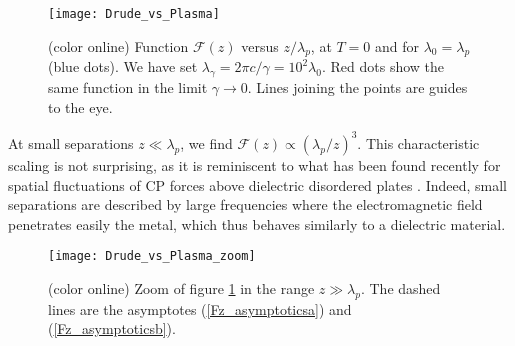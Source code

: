 \documentclass[doublecol]{epl2}
\begin{document}
\begin{figure}[h]
\texttt{[image: Drude\_vs\_Plasma]}
\caption{
\label{Drude_vs_Plasma}
(color online) Function $\mathcal{F}(z)$ versus $z/\lambda_p$, at $T=0$ and for $\lambda_0=\lambda_p$ (blue dots). We have set $\lambda_\gamma=2\pi c/\gamma=10^2\lambda_0$. Red dots show the same function in the limit $\gamma\to 0$. Lines joining the points are guides to the eye.}
\end{figure}
At small separations $z\ll\lambda_p$, we find $\mathcal{F}(z)\propto (\lambda_p/z)^3$. This characteristic scaling is not surprising, as it is reminiscent to what has been found recently for spatial fluctuations of CP forces above dielectric disordered plates \cite{Dean09, Cherroret15}. Indeed, small separations are described by large frequencies where the electromagnetic field penetrates easily the metal, which thus behaves similarly to a dielectric material. 
\begin{figure}[h]
\texttt{[image: Drude\_vs\_Plasma\_zoom]}
\caption{
\label{Drude_vs_Plasma_zoom}
(color online) Zoom of figure \ref{Drude_vs_Plasma} in the range $z\gg\lambda_p$.
The dashed lines are the asymptotes (\ref{Fz_asymptoticsa}) and (\ref{Fz_asymptoticsb}).
}
\end{figure}
\end{document}
